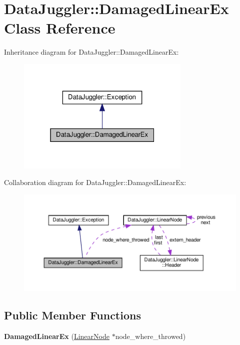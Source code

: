 \hypertarget{classDataJuggler_1_1DamagedLinearEx}{}\section{Data\+Juggler\+:\+:Damaged\+Linear\+Ex Class Reference}
\label{classDataJuggler_1_1DamagedLinearEx}


Inheritance diagram for Data\+Juggler\+:\+:Damaged\+Linear\+Ex\+:\nopagebreak
\begin{figure}[H]
\begin{center}
\leavevmode
\includegraphics[width=235pt]{classDataJuggler_1_1DamagedLinearEx__inherit__graph}
\end{center}
\end{figure}


Collaboration diagram for Data\+Juggler\+:\+:Damaged\+Linear\+Ex\+:\nopagebreak
\begin{figure}[H]
\begin{center}
\leavevmode
\includegraphics[width=350pt]{classDataJuggler_1_1DamagedLinearEx__coll__graph}
\end{center}
\end{figure}
\subsection*{Public Member Functions}
\begin{DoxyCompactItemize}
\item 
\mbox{\label{classDataJuggler_1_1DamagedLinearEx_a7021efc33d1a5330da8bbf0530056006}} 
{\bfseries Damaged\+Linear\+Ex} (\hyperlink{classDataJuggler_1_1LinearNode}{Linear\+Node} $\ast$node\+\_\+where\+\_\+throwed)
\end{DoxyCompactItemize}
